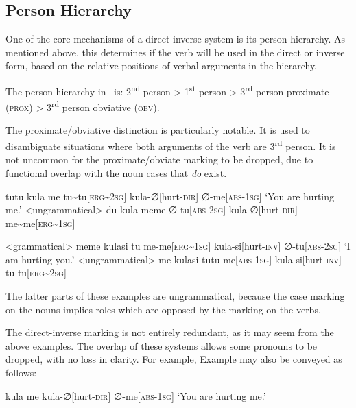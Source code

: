 \subsection{Person Hierarchy}\label{sec:person_hierarchy}
One of the core mechanisms of a direct-inverse system is its person hierarchy.
As mentioned above, this determines if the verb will be used in the direct or inverse form, based on the relative positions of verbal arguments in the hierarchy.

The person hierarchy in \langname\ is: 2\textsuperscript{nd} person > 1\textsuperscript{st} person > 3\textsuperscript{rd} person proximate (\textsc{prox}) > 3\textsuperscript{rd} person obviative (\textsc{obv}).

The proximate/obviative distinction is particularly notable.
It is used to disambiguate situations where both arguments of the verb are 3\textsuperscript{rd} person.
It is not uncommon for the proximate/obviate marking to be dropped, due to functional overlap with the noun cases that \textit{do} exist.

\begingl
\glpreamble tutu kula me
\endpreamble
tu\textasciitilde tu[\textsc{erg\textasciitilde 2sg}]
kula-∅[hurt-\textsc{dir}]
∅-me[\textsc{abs-1sg}]
\glft `You are hurting me.'
\endgl
\a<ungrammatical>
\begingl
\glpreamble \ljudge{*} du kula meme
\endpreamble
∅-tu[\textsc{abs-2sg}]
kula-∅[hurt-\textsc{dir}]
me\textasciitilde me[\textsc{erg\textasciitilde 1sg}]
\endgl
\xe

\a<grammatical>
\begingl
\glpreamble meme kulasi tu
\endpreamble
me-me[\textsc{erg\textasciitilde 1sg}]
kula-si[hurt-\textsc{inv}]
∅-tu[\textsc{abs-2sg}]
\glft `I am hurting you.'
\endgl
\a<ungrammatical>
\begingl
\glpreamble \ljudge{*} me kulasi tutu
\endpreamble
me[\textsc{abs-1sg}]
kula-si[hurt-\textsc{inv}]
tu-tu[\textsc{erg\textasciitilde 2sg}]
\endgl
\xe

The latter parts of these examples are ungrammatical, because the case marking on the nouns implies roles which are opposed by the marking on the verbs.

The direct-inverse marking is not entirely redundant, as it may seem from the above examples.
The overlap of these systems allows some pronouns to be dropped, with no loss in clarity.
For example, Example  may also be conveyed as follows:

\ex
\begingl
\glpreamble kula me
\endpreamble
kula-∅[hurt-\textsc{dir}]
∅-me[\textsc{abs-1sg}]
\glft `You are hurting me.'
\endgl
\xe

